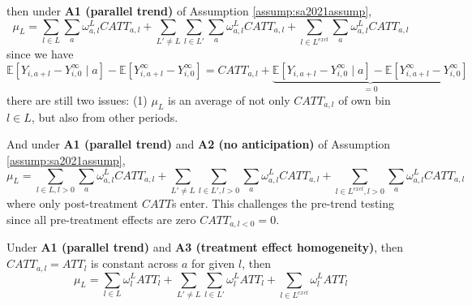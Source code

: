 \documentclass[twoside]{article}
\begin{document}
then under \textbf{A1 (parallel trend)} of Assumption \ref{assump:sa2021assump},
$$ \mu_L = \sum_{l\in L}\sum_a \omega^{L}_{a,l} CATT_{a,l} + \sum_{L'\neq L} \sum_{l\in L'}\sum_a \omega^{L}_{a,l} CATT_{a,l} + \sum_{l\in L^{excl}} \sum_a \omega^{L}_{a,l} CATT_{a,l} $$
since we have $$ \mathbb{E}\left[Y_{i,a+l}-Y^{\infty}_{i,0}\mid a \right] - \mathbb{E} \left[Y^{\infty}_{i,a+l}-Y^{\infty}_{i,0}\right] = CATT_{a,l} + \underbrace{\mathbb{E}\left[Y_{i,a+l}-Y^{\infty}_{i,0}\mid a \right] - \mathbb{E} \left[Y^{\infty}_{i,a+l}-Y^{\infty}_{i,0}\right]}_{=0} $$
there are still two issues: (1) $\mu_L$ is an average of not only $CATT_{a,l}$ of own bin $l\in L$, but also from other periods.

And under \textbf{A1 (parallel trend)} and \textbf{A2 (no anticipation)} of Assumption \ref{assump:sa2021assump}, 
$$ \mu_L = \sum_{l\in L,l>0}\sum_a \omega^{L}_{a,l} CATT_{a,l} + \sum_{L'\neq L} \sum_{l\in L',l>0}\sum_a \omega^{L}_{a,l} CATT_{a,l} + \sum_{l\in L^{excl},l>0} \sum_a \omega^{L}_{a,l} CATT_{a,l} $$
where only post-treatment $CATT$s enter. This challenges the pre-trend testing since all pre-treatment effects are zero $CATT_{a,l<0}=0$.

Under \textbf{A1 (parallel trend)} and \textbf{A3 (treatment effect homogeneity)}, then $CATT_{a,l}=ATT_l$ is constant across $a$ for given $l$, then 
$$ \mu_L = \sum_{l\in L}\omega^L_l ATT_l + \sum_{L'\neq L}\sum_{l\in L'}\omega^L_{l}ATT_l + \sum_{l\in L^{excl}}\omega^L_{l}ATT_l $$
\end{document}
